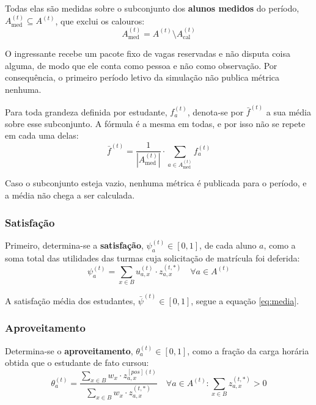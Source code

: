 \documentclass[
    12pt,
    openany,
    oneside,
    a4paper,
    english,
    brazil
]{abntex2}
\begin{document}
Todas elas são medidas sobre o subconjunto dos \textbf{alunos medidos} do período, $A_\text{med}^{(t)} \subseteq A^{(t)}$, que exclui os calouros:
\begin{equation} \label{eq:medidos}
    A_\text{med}^{(t)} = A^{(t)} \setminus A_\text{cal}^{(t)}
\end{equation}

O ingressante recebe um pacote fixo de vagas reservadas e não disputa coisa alguma, de modo que ele conta como pessoa e não como observação. Por consequência, o primeiro período letivo da simulação não publica métrica nenhuma.

Para toda grandeza definida por estudante, $f_a^{(t)}$, denota-se por $\bar{f}^{(t)}$ a sua média sobre esse subconjunto. A fórmula é a mesma em todas, e por isso não se repete em cada uma delas:
\begin{equation} \label{eq:media}
    \bar{f}^{(t)} =
    \frac{1}{\left| A_\text{med}^{(t)} \right|} \cdot
    \sum_{a \in A_\text{med}^{(t)}} f_a^{(t)}
\end{equation}

Caso o subconjunto esteja vazio, nenhuma métrica é publicada para o período, e a média não chega a ser calculada.

\subsubsection{Satisfação}
 
Primeiro, determina-se a \textbf{satisfação}, $\psi_a^{(t)} \in [0, 1]$, de cada aluno $a$, como a soma total das utilidades das turmas cuja solicitação de matrícula foi deferida:
\begin{equation}
    \psi_a^{(t)} = \sum_{x \in B} u_{a, x}^{(t)} \cdot z_{a, x}^{(t, *)}
    \quad \forall a \in A^{(t)}
\end{equation}

A satisfação média dos estudantes, $\bar{\psi}^{(t)} \in [0, 1]$, segue a equação \eqref{eq:media}.

\subsubsection{Aproveitamento}

Determina-se o \textbf{aproveitamento}, $\theta_a^{(t)} \in [0, 1]$, como a fração da carga horária obtida que o estudante de fato cursou:
\begin{equation}
    \theta_a^{(t)} = \frac{\sum_{x \in B} w_x \cdot z_{a, x}^{[pos](t)}}{\sum_{x \in B} w_x \cdot z_{a, x}^{(t, *)}}
    \quad \forall a \in A^{(t)} : \sum_{x \in B} z_{a, x}^{(t, *)} > 0
\end{equation}
\end{document}
